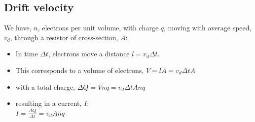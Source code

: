 \documentclass[aspectratio=169,
hyperref={colorlinks,urlcolor=blue}
]{beamer}
\begin{document}
\subsection{Drift velocity}
\label{subsec:driftvelocity}
{
We have, $n$, electrons per unit volume, with charge $q$, moving with average speed, $v_d$, through a resistor of cross-section, $A$: 
 \begin{itemize}
 \item<1-> In time $\Delta t$, electrons move a distance $l=v_d\Delta t$.
 \item<2-> This corresponds to a volume of electrons, $V=lA=v_d\Delta t A$
 \item<3-> with a total charge, $\Delta Q = Vnq = v_d\Delta t A nq$
 \item<4-> resulting in a current, $I$:\\
 $I=\frac{\Delta Q}{\Delta t}=v_d A nq$
 \end{itemize}
}
\end{document}
